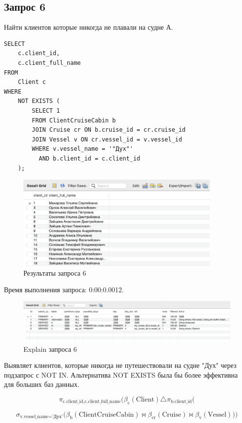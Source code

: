 \documentclass[11pt,a4paper,final]{article}
\begin{document}
\subsection{Запрос 6}
Найти клиентов которые никогда не плавали на судне А.
\begin{lstlisting}[style=sqlstyle, label=sql:query1]
SELECT
    c.client_id,
    c.client_full_name
FROM
    Client c
WHERE
    NOT EXISTS (
        SELECT 1
        FROM ClientCruiseCabin b
        JOIN Cruise cr ON b.cruise_id = cr.cruise_id
        JOIN Vessel v ON cr.vessel_id = v.vessel_id
        WHERE v.vessel_name = '"Дух"'
          AND b.client_id = c.client_id 
    );
\end{lstlisting}
\begin{figure}[h!]
    \centering
    \includegraphics[width=0.9\textwidth]{22.png} 
    \caption{Результаты запроса 6}
\end{figure}
{\centering
Время выполнения запроса: 0:00:0.0012.\par}
\begin{figure}[H]
    \centering
    \includegraphics[width=\textwidth]{28.png} 
    \caption{Explain запроса 6}
\end{figure}

Выявляет клиентов, которые никогда не путешествовали на судне "Дух" \newline через подзапрос с NOT IN. Альтернатива NOT EXISTS была бы более эффективна для больших баз данных.

$$
\pi_{\text{c.client\_id}, \text{c.client\_full\_name}} \Bigg(
\beta_{\text{c}}(\text{Client}) \triangle \pi_{\text{b.client\_id}} \Bigg(
$$

$$
\sigma_{\text{v.vessel\_name} = \text{'Дух'}} \Bigg(
\beta_{\text{b}}(\text{ClientCruiseCabin}) \bowtie \beta_{\text{cr}}(\text{Cruise}) \bowtie \beta_{\text{v}}(\text{Vessel})
\Bigg)\Bigg)
$$
\\
\\
\end{document}
